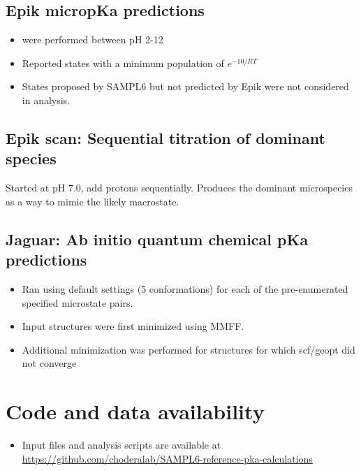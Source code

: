\documentclass[9pt,lineno,final]{elife}
\begin{document}
\subsection{Epik micropKa predictions}
\begin{itemize}
	\item were performed between pH 2-12
	\item Reported states with a minimum population of $e^{-10/RT}$
	\item States proposed by SAMPL6 but not predicted by Epik were not considered in analysis.
	      
\end{itemize}

\subsection{Epik scan: Sequential titration of dominant species} 


Started at pH 7.0, add protons sequentially. 
%
Produces the dominant microspecies as a way to mimic the likely macrostate.
%


\subsection{Jaguar: Ab initio quantum chemical pKa predictions}
\begin{itemize}
	\item Ran using default settings (5 conformations) for each of the pre-enumerated specified microstate pairs.
	\item Input structures were first minimized using MMFF.
	\item Additional minimization was performed for structures for which scf/geopt did not converge
\end{itemize}





\section{Code and data availability}

\begin{itemize}
	\item Input files and analysis scripts are available at \href{https://github.com/choderalab/SAMPL6-reference-pka-calculations}{https://github.com/choderalab/SAMPL6-reference-pka-calculations}
\end{itemize}
\end{document}
